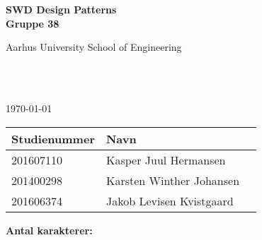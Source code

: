 \begin{center}
	{\fontsize{36pt}{0}\selectfont
		\textbf{
		SWD Design Patterns\\
		Gruppe 38\\
		}
	}
	\vspace{20pt}

	{\fontsize{14pt}{0}\selectfont
		Aarhus University School of Engineering\\
	}
	\vspace{20pt}

	{\fontsize{24pt}{0}\selectfont
		\thetitle\\
	}
	\vspace{20pt}

	{\fontsize{18pt}{0}\selectfont
		\ifdefined\frontpageDate
			\frontpageDate\\
		\else
			\today\\
		\fi
	}
	\vspace{20pt}

	\vspace{5pt}
	\begin{tabular}{|l|l|l|}
		\hline
		\rowcolor{gray!50}
		\textbf{Studienummer} & \textbf{Navn}\\ [5px]
		\hline
		201607110 & Kasper Juul Hermansen\\
		\hline
		201400298 & Karsten Winther Johansen\\
		\hline
		201606374 & Jakob Levisen Kvistgaard\\
		\hline
	\end{tabular}

	\ifdefined\frontpageCharacters
		\vspace{10pt}
		\textbf{Antal karakterer: } \frontpageCharacters\\
	\fi
	\vspace{30pt}

\end{center}
